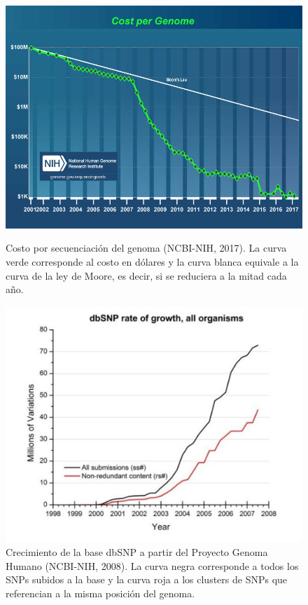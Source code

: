 \begin{figure}[H]
\begin{minipage}[c]{0.45\linewidth}
\includegraphics[width=\linewidth]{documents/latex/figures/1/costpergenome_2017.pdf}
\caption{Costo por secuenciación del genoma (NCBI-NIH, 2017). La curva verde corresponde al costo en dólares y la curva blanca equivale a la curva de la ley de Moore, es decir, si se reduciera a la mitad cada año.}
\label{fig:cost_per_genome}
\end{minipage}
\hfill
\begin{minipage}[c]{0.45\linewidth}
\includegraphics[width=\linewidth]{documents/latex/figures/1/increase_dbsnp.pdf}
\caption{Crecimiento de la base dbSNP a partir del Proyecto Genoma Humano (NCBI-NIH, 2008). La curva negra corresponde a todos los SNPs subidos a la base y la curva roja a los clusters de SNPs que referencian a la misma posición del genoma.}
\label{fig:dbsnp_growth_rate}
\end{minipage}%
\end{figure}

